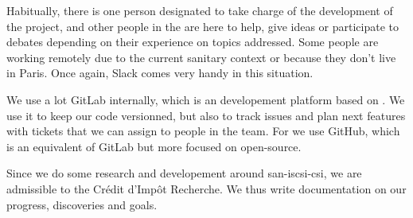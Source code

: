 Habitually, there is one person designated to take charge of the development of the project, and other people in the  are here to help, give ideas or participate to debates depending on their experience on topics addressed. Some people are working remotely due to the current sanitary context or because they don't live in Paris. Once again, Slack comes very handy in this situation.

We use a lot GitLab internally, which is an  developement platform based on . We use it to keep our code versionned, but also to track issues and plan next features with tickets that we can assign to people in the team. For  we use GitHub, which is an equivalent of GitLab but more focused on open-source.

Since we do some research and developement around \gls{san-iscsi-csi}, we are admissible to the Crédit d'Impôt Recherche. We thus write documentation on our progress, discoveries and goals.

\clearpage
